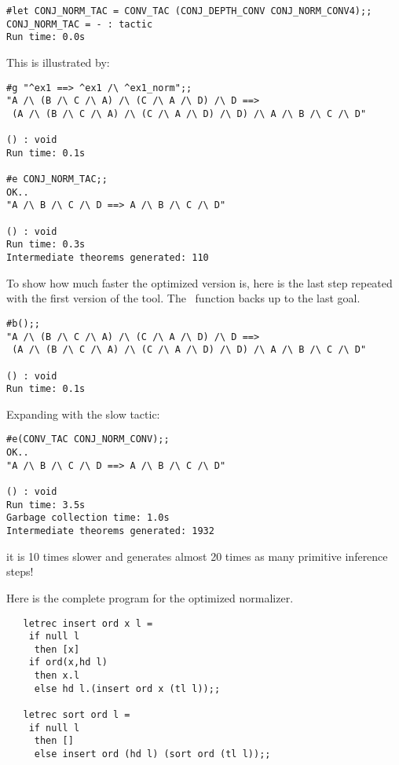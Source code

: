 \begin{session}\begin{verbatim}
#let CONJ_NORM_TAC = CONV_TAC (CONJ_DEPTH_CONV CONJ_NORM_CONV4);;
CONJ_NORM_TAC = - : tactic
Run time: 0.0s
\end{verbatim}\end{session}

\noindent This is illustrated by:

\begin{session}\begin{verbatim}
#g "^ex1 ==> ^ex1 /\ ^ex1_norm";;
"A /\ (B /\ C /\ A) /\ (C /\ A /\ D) /\ D ==>
 (A /\ (B /\ C /\ A) /\ (C /\ A /\ D) /\ D) /\ A /\ B /\ C /\ D"

() : void
Run time: 0.1s

#e CONJ_NORM_TAC;;
OK..
"A /\ B /\ C /\ D ==> A /\ B /\ C /\ D"

() : void
Run time: 0.3s
Intermediate theorems generated: 110
\end{verbatim}\end{session}

\noindent To show how much faster the optimized version is, here is
the last step repeated with the first version of the tool. The \ML\
function  backs up to the last goal.

\begin{session}\begin{verbatim}
#b();;
"A /\ (B /\ C /\ A) /\ (C /\ A /\ D) /\ D ==>
 (A /\ (B /\ C /\ A) /\ (C /\ A /\ D) /\ D) /\ A /\ B /\ C /\ D"

() : void
Run time: 0.1s
\end{verbatim}\end{session}

\noindent Expanding with the slow tactic:

\begin{session}\begin{verbatim}
#e(CONV_TAC CONJ_NORM_CONV);;
OK..
"A /\ B /\ C /\ D ==> A /\ B /\ C /\ D"

() : void
Run time: 3.5s
Garbage collection time: 1.0s
Intermediate theorems generated: 1932
\end{verbatim}\end{session}

\noindent it is 10 times slower and generates almost 20 times as many
primitive inference steps!


Here is the complete \ML{} program for the optimized normalizer.

\begin{hol}\begin{verbatim}
   letrec insert ord x l =
    if null l
     then [x]
    if ord(x,hd l)
     then x.l
     else hd l.(insert ord x (tl l));;

   letrec sort ord l =
    if null l
     then []
     else insert ord (hd l) (sort ord (tl l));;
\end{verbatim}\end{hol}


